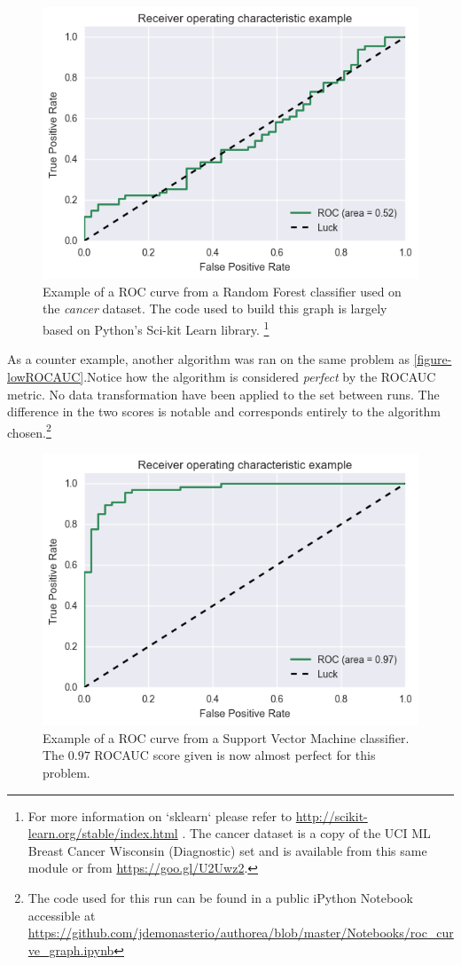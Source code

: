 \begin{figure}[h!]
\begin{center}
\includegraphics[width=0.7\columnwidth]{figures/figure-lowROCAUC/figure-lowROCAUC_original}
\caption{Example of a ROC curve from a Random Forest classifier used on the \textit{cancer} dataset.  The code used to build this graph is largely based on Python's Sci-kit Learn library. \protect\footnote{For more information on `sklearn` please refer to \url{http://scikit-learn.org/stable/index.html} \protect\textcite{sci-kit} . The cancer dataset is a copy of the UCI ML Breast Cancer Wisconsin (Diagnostic) set and is available from this same module or from \url{https://goo.gl/U2Uwz2}.}  }
\end{center}
\end{figure}
%

As a counter example, another algorithm was ran on the same problem as \ref{figure-lowROCAUC}.Notice how the algorithm is considered \textit{perfect} by the ROCAUC metric. No data transformation have been applied to the set between runs. The difference in the two scores is notable and corresponds entirely to the algorithm chosen.\footnote{The code used for this run can be found in a public iPython Notebook accessible at \url{https://github.com/jdemonasterio/authorea/blob/master/Notebooks/roc_curve_graph.ipynb}}

\begin{figure}[h!]
\begin{center}
\includegraphics[width=0.7\columnwidth]{figures/figure-highROCAUC/figure-highROCAUC}
\caption{Example of a ROC curve from a Support Vector Machine classifier. The $0.97$ ROCAUC score given is now almost perfect for this problem.%
}
\end{center}
\end{figure}

